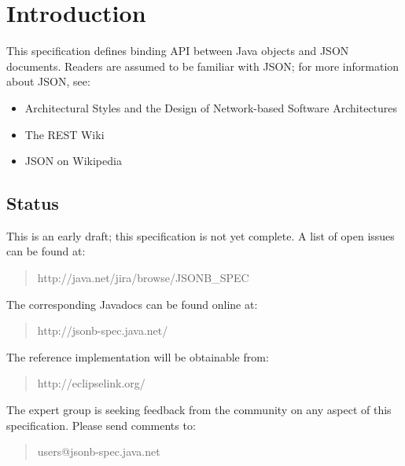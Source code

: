 \chapter{Introduction}

This specification defines binding API between Java objects and JSON \cite{rfc7159} documents. Readers are assumed to be familiar with JSON; for more information about JSON, see:

\begin{itemize}
\item Architectural Styles and the Design of Network-based Software Architectures\cite{rest}
\item The REST Wiki\cite{restwiki}
\item JSON on Wikipedia\cite{jsonwikipedia}
\end{itemize}

\section{Status}
\label{status}

This is an early draft; this specification is not yet complete. A list of open issues can be found at:


\begin{quote}
http://java.net/jira/browse/JSONB\_SPEC
\end{quote}

The corresponding Javadocs can be found online at:

\begin{quote}
http://jsonb-spec.java.net/
\end{quote}

The reference implementation will be obtainable from:

\begin{quote}
http://eclipselink.org/
\end{quote}

The expert group is seeking feedback from the community on any aspect of this specification. Please send comments to:

\begin{quote}
users@jsonb-spec.java.net
\end{quote}

